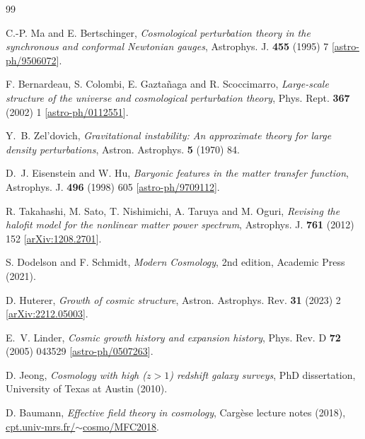 \documentclass[a4paper,11pt]{article}
\numberwithin{equation}{section}
\begin{document}
\begin{thebibliography}{99}

C.-P. Ma and E. Bertschinger,
\emph{Cosmological perturbation theory in the synchronous and conformal Newtonian gauges},
Astrophys. J. \textbf{455} (1995) 7
[\href{https://arxiv.org/abs/astro-ph/9506072}{astro-ph/9506072}].

F. Bernardeau, S. Colombi, E. Gazta\~naga and R. Scoccimarro,
\emph{Large-scale structure of the universe and cosmological perturbation theory},
Phys. Rept. \textbf{367} (2002) 1
[\href{https://arxiv.org/abs/astro-ph/0112551}{astro-ph/0112551}].

Y.~B. Zel'dovich,
\emph{Gravitational instability: An approximate theory for large density perturbations},
Astron. Astrophys. \textbf{5} (1970) 84.

D.~J. Eisenstein and W. Hu,
\emph{Baryonic features in the matter transfer function},
Astrophys. J. \textbf{496} (1998) 605
[\href{https://arxiv.org/abs/astro-ph/9709112}{astro-ph/9709112}].

R. Takahashi, M. Sato, T. Nishimichi, A. Taruya and M. Oguri,
\emph{Revising the halofit model for the nonlinear matter power spectrum},
Astrophys. J. \textbf{761} (2012) 152
[\href{https://arxiv.org/abs/1208.2701}{arXiv:1208.2701}].

S. Dodelson and F. Schmidt,
\emph{Modern Cosmology}, 2nd edition,
Academic Press (2021).

D. Huterer,
\emph{Growth of cosmic structure},
Astron. Astrophys. Rev. \textbf{31} (2023) 2
[\href{https://arxiv.org/abs/2212.05003}{arXiv:2212.05003}].

E.~V. Linder,
\emph{Cosmic growth history and expansion history},
Phys. Rev. D \textbf{72} (2005) 043529
[\href{https://arxiv.org/abs/astro-ph/0507263}{astro-ph/0507263}].

D. Jeong,
\emph{Cosmology with high ($z>1$) redshift galaxy surveys},
PhD dissertation, University of Texas at Austin (2010).

D. Baumann,
\emph{Effective field theory in cosmology},
Carg\`ese lecture notes (2018),
\href{https://www.cpt.univ-mrs.fr/~cosmo/MFC2018/DOCUMENTS/SLIDES/Baumann.pdf}{cpt.univ-mrs.fr/$\sim$cosmo/MFC2018}.


\end{thebibliography}
\end{document}
